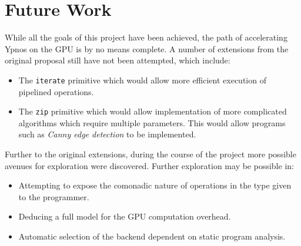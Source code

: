 \documentclass[
    12pt,
    a4paper,
    twoside,
    openright,
    ]{scrbook}
\begin{document}
\section{Future Work}

While all the goals of this project have been achieved, the path of accelerating
Ypnos on the GPU is by no means complete. A number of extensions from the
original proposal still have not been attempted, which include:

\begin{itemize}
\item The \texttt{iterate} primitive which would allow more efficient execution
  of pipelined operations.
\item The \texttt{zip} primitive which would allow implementation of more
  complicated algorithms which require multiple parameters. This would allow
  programs such as \emph{Canny edge detection} to be implemented.
\end{itemize}

Further to the original extensions, during the course of the project more
possible avenues for exploration were discovered. Further exploration may be
possible in:

\begin{itemize}
\item
  Attempting to expose the comonadic nature of operations in the type given to
  the programmer.
\item
  Deducing a full model for the GPU computation overhead.
\item
  Automatic selection of the backend dependent on static program analysis.
\end{itemize}

\printbibliography[heading=bibintoc]

\appendix


\end{document}
